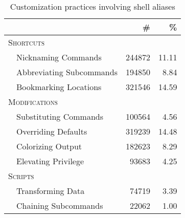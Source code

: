 \begin{table}
	\caption{Customization practices involving shell aliases}
    \label{tab:practices}
    \begin{tabular}{llrr}
        & & \# & \% \\
        \toprule
        \multicolumn{2}{l}{\textsc{Shortcuts}} & & \\
        & Nicknaming Commands       & \num{244872} & 11.11 \\
        & Abbreviating Subcommands  & \num{194850} &  8.84 \\
        & Bookmarking Locations     & \num{321546} & 14.59 \\
        \midrule
        \multicolumn{2}{l}{\textsc{Modifications}} & & \\
        & Substituting Commands     & \num{100564} &  4.56 \\
        & Overriding Defaults       & \num{319239} & 14.48 \\
        & Colorizing Output         & \num{182623} &  8.29 \\
        & Elevating Privilege       &  \num{93683} &  4.25 \\
        \midrule
        \multicolumn{2}{l}{\textsc{Scripts}} & & \\
        & Transforming Data         &  \num{74719} &  3.39 \\
        & Chaining Subcommands      &  \num{22062} &  1.00 \\
        \bottomrule
        \end{tabular}
\end{table}